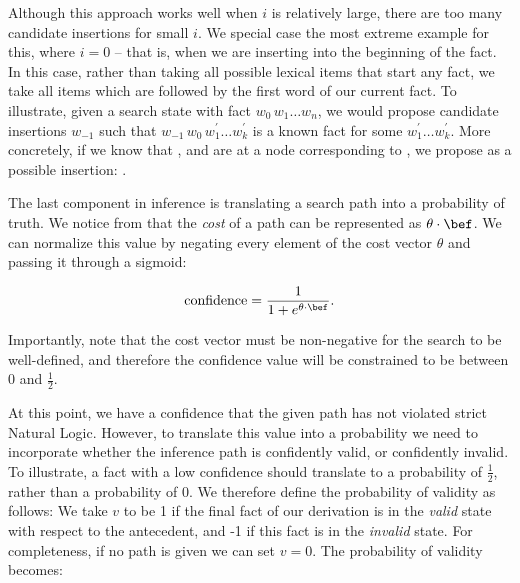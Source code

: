Although this approach works well when $i$ is relatively large, there
  are too many candidate insertions for small $i$.
We special case the most extreme example for this, where $i=0$ -- that is, 
  when we are inserting into the beginning of the fact.
In this case, rather than taking all possible lexical items that start
  any fact, we take all items which are followed by the first word of
  our current fact.
To illustrate, given a search state with fact $w_0\,w_1 \dots w_n$,
  we would propose candidate insertions $w_{-1}$ such that
  $w_{-1}\,w_0\,w^\prime_1 \dots w^\prime_k$ is a known fact
  for some $w^\prime_1 \dots w^\prime_k$.
More concretely, if we know that , and are
  at a node corresponding to , we propose 
  as a possible insertion: .

%
%
The last component in inference is translating a search path into a
  probability of truth.
We notice from  that the \textit{cost}
  of a path can be represented as $\theta \cdot \bef$.
We can normalize this value by negating every element of the cost
  vector $\theta$ and passing it through a sigmoid:

\vspace{-0.5em}
\begin{equation*}
\textrm{confidence} = \frac{1}{1 + e^{\theta \cdot \bef}}.
\end{equation*}
\vspace{-0.5em}

Importantly, note that the cost vector must be non-negative for the
  search to be well-defined, and therefore the confidence value will
  be constrained to be between 0 and $\frac{1}{2}$.

At this point, we have a confidence that the given path has not violated
  strict Natural Logic.
However, to translate this value into a probability
  we need to incorporate whether the inference path is
  confidently valid, or confidently invalid.
To illustrate, a fact with a low confidence should translate to a
  probability of $\frac{1}{2}$, rather than a probability of 0.
We therefore define the probability of validity as follows:
We take $v$ to be 1 if the final fact of our derivation is in the
  \textit{valid} state with respect to the antecedent,
  and -1 if this fact is in the \textit{invalid} state.
For completeness, if no path is given we can set $v=0$.
The probability of validity becomes:

